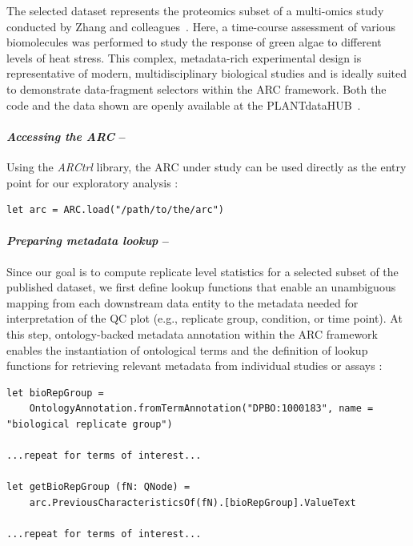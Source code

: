 \documentclass{jib}
\begin{document}
The selected dataset represents the proteomics subset of a multi-omics study conducted by Zhang and colleagues~\cite{zhang2022heatresponses}. Here, a time-course assessment of various biomolecules was performed to study the response of green algae to different levels of heat stress. This complex, metadata-rich experimental design is representative of modern, multidisciplinary biological studies and is ideally suited to demonstrate data-fragment selectors within the ARC framework. Both the code and the data shown are openly available at the PLANTdataHUB~\cite{zhang2023ruchlamy}.

\paragraph{\emph{Accessing the ARC} –}

Using the \emph{ARCtrl} library, the ARC under study can be used directly as the entry point for our exploratory analysis \cite{weil2025arctrl}:

\begin{verbatim}
let arc = ARC.load("/path/to/the/arc")
\end{verbatim}

\paragraph{\emph{Preparing metadata lookup} –}

Since our goal is to compute replicate level statistics for a selected subset of the published dataset, we first define lookup functions that enable an unambiguous mapping from each downstream data entity to the metadata needed for interpretation of the QC plot (e.g., replicate group, condition, or time point). At this step, ontology-backed metadata annotation within the ARC framework enables the instantiation of ontological terms and the definition of lookup functions for retrieving relevant metadata from individual studies or assays \cite{weil2025arcquerymodel}:

\begin{verbatim}
let bioRepGroup = 
    OntologyAnnotation.fromTermAnnotation("DPBO:1000183", name = "biological replicate group")

...repeat for terms of interest...

let getBioRepGroup (fN: QNode) =
    arc.PreviousCharacteristicsOf(fN).[bioRepGroup].ValueText 
    
...repeat for terms of interest...
\end{verbatim}
\end{document}
